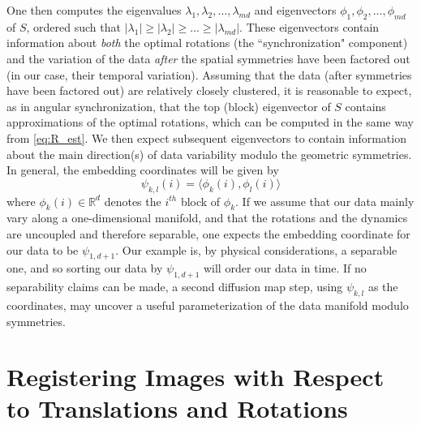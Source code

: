 \documentclass{pnastwo}
\begin{document}
\begin{article}
\begin{materials}
One then computes the eigenvalues $\lambda_1, \lambda_2, \dots, \lambda_{md}$ and eigenvectors $\phi_1, \phi_2, \dots, \phi_{md}$ of $S$, ordered such that $|\lambda_1| \ge |\lambda_2| \ge \dots \ge |\lambda_{md}|$.
%
These eigenvectors contain information about {\em both} the optimal rotations (the ``synchronization" component) and the
variation of the data {\em after} the spatial symmetries have been factored out (in our case, their temporal variation).
%
Assuming that the data (after symmetries have been factored out) are relatively closely clustered, it is reasonable
to expect, as in angular synchronization, that the top (block) eigenvector of $S$ contains approximations of the optimal rotations,
which can be computed in the same way from \eqref{eq:R_est}.
%
We then expect subsequent eigenvectors to contain information about the main direction(s) of data variability modulo the geometric symmetries.
%
In general, the embedding coordinates will be given by
\begin{equation}
\psi_{k,l} (i) = \langle \phi_k(i), \phi_l(i) \rangle
\end{equation}
where $\phi_k(i) \in \mathbb{R}^d$ denotes the $i^{th}$ block of $\phi_k$.
%
If we assume that our data mainly vary along a one-dimensional manifold, and that the rotations and the dynamics are uncoupled and therefore separable, one expects the embedding coordinate for our data %
to be  $\psi_{1,d+1}$.
%
Our example is, by physical considerations, a separable one, and so sorting our data by $\psi_{1,d+1}$ will order our data in time.
%
If no separability claims can be made, a second diffusion map step, using $\psi_{k,l}$ as the coordinates, may uncover a
useful parameterization of the data manifold modulo symmetries.

\section{Registering Images with Respect to Translations and Rotations} \label{subsec:trans_rot_register}


\end{materials}
\end{article}
\end{document}
